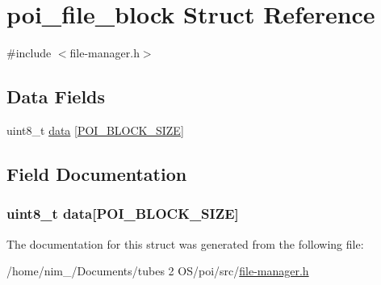 \hypertarget{structpoi__file__block}{\section{poi\-\_\-file\-\_\-block Struct Reference}
\label{structpoi__file__block}
}


{\ttfamily \#include $<$file-\/manager.\-h$>$}

\subsection*{Data Fields}
\begin{DoxyCompactItemize}
\item 
uint8\-\_\-t \hyperlink{structpoi__file__block_a453580bb9858958a75d49cd9a450a4b3}{data} \mbox{[}\hyperlink{file-manager_8h_afb59af7070cf0cd010913eef940ffbbd}{P\-O\-I\-\_\-\-B\-L\-O\-C\-K\-\_\-\-S\-I\-Z\-E}\mbox{]}
\end{DoxyCompactItemize}


\subsection{Field Documentation}
\hypertarget{structpoi__file__block_a453580bb9858958a75d49cd9a450a4b3}{
\subsubsection[{data}]{\setlength{\rightskip}{0pt plus 5cm}uint8\-\_\-t data\mbox{[}{\bf P\-O\-I\-\_\-\-B\-L\-O\-C\-K\-\_\-\-S\-I\-Z\-E}\mbox{]}}}\label{structpoi__file__block_a453580bb9858958a75d49cd9a450a4b3}


The documentation for this struct was generated from the following file\-:\begin{DoxyCompactItemize}
\item 
/home/nim\-\_/\-Documents/tubes 2 O\-S/poi/src/\hyperlink{file-manager_8h}{file-\/manager.\-h}\end{DoxyCompactItemize}
